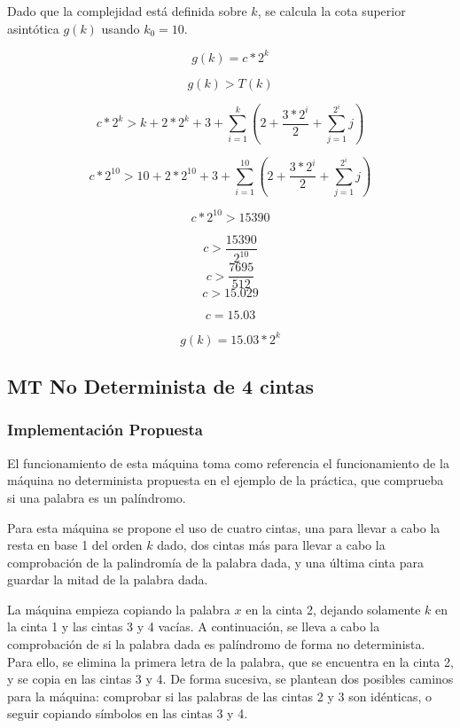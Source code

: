 \documentclass{uc3mpracticas}
\begin{document}
Dado que la complejidad está definida sobre $k$, se calcula la cota superior asintótica $g(k)$ usando $k_0 = 10$.

$$ g(k) = c*2^k $$

$$ g(k) > T(k) $$


$$c*2^k >  k + 2*2^k + 3 + \displaystyle\sum_{i=1}^k (2 + \frac{3*2^i}{2} + \displaystyle\sum_{j=1}^{2^i} j) $$

$$c*2^{10} > 10 + 2*2^{10} + 3 + \displaystyle\sum_{i=1}^{10} (2 + \frac{3*2^i}{2} + \displaystyle\sum_{j=1}^{2^i} j) $$

$$ c*2^{10} > 15390 $$

$$ c > \frac{15390}{2^{10}} $$
$$ c >  \frac{7695}{512}$$
$$ c > 15.029 $$

$$ c = 15.03 $$

$$ g(k) = 15.03*2^k $$



\subsection{MT No Determinista de 4 cintas}

\subsubsection{Implementación Propuesta}

El funcionamiento de esta máquina toma como referencia el funcionamiento de la máquina no determinista propuesta en el ejemplo de la práctica, que comprueba si una palabra es un palíndromo.

\vspace{2mm}

Para esta máquina se propone el uso de cuatro cintas, una para llevar a cabo la resta en base 1 del orden $k$ dado, dos cintas más para llevar a cabo la comprobación de la palindromía de la palabra dada, y una última cinta para guardar la mitad de la palabra dada.

\vspace{2mm}

La máquina empieza copiando la palabra $x$ en la cinta 2, dejando solamente $k$ en la cinta 1 y las cintas 3 y 4 vacías. A continuación, se lleva a cabo la comprobación de si la palabra dada es palíndromo de forma no determinista. Para ello, se elimina la primera letra de la palabra, que se encuentra en la cinta 2, y se copia en las cintas 3 y 4. De forma sucesiva, se plantean dos posibles caminos para la máquina: comprobar si las palabras de las cintas 2 y 3 son idénticas, o seguir copiando símbolos en las cintas 3 y 4.
\end{document}
